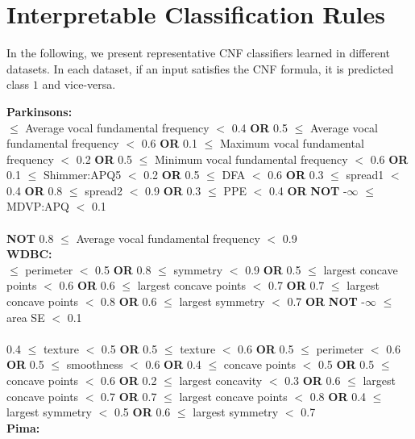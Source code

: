 \chapter{Interpretable Classification Rules}
In the following, we present representative CNF classifiers learned in different datasets. In each dataset, if an input satisfies the CNF formula, it is predicted class $ 1 $ and vice-versa.

\noindent \textbf{ Parkinsons: }\\

 $\le$ Average vocal fundamental frequency $<$ 0.4 \textbf{OR} 0.5 $\le$ Average vocal fundamental frequency $<$ 0.6 \textbf{OR} 0.1 $\le$ Maximum vocal fundamental frequency $<$ 0.2 \textbf{OR} 0.5 $\le$ Minimum vocal fundamental frequency $<$ 0.6 \textbf{OR} 0.1 $\le$ Shimmer:APQ5 $<$ 0.2 \textbf{OR} 0.5 $\le$ DFA $<$ 0.6 \textbf{OR} 0.3 $\le$ spread1 $<$ 0.4 \textbf{OR} 0.8 $\le$ spread2 $<$ 0.9 \textbf{OR} 0.3 $\le$ PPE $<$ 0.4 \textbf{OR}  \textbf{NOT} -$\infty$ $\le$ MDVP:APQ $<$ 0.1 \\\\ \textbf{NOT} 0.8 $\le$ Average vocal fundamental frequency $<$ 0.9 \\

\noindent \textbf{ WDBC: }\\

 $\le$ perimeter $<$ 0.5 \textbf{OR} 0.8 $\le$ symmetry $<$ 0.9 \textbf{OR} 0.5 $\le$ largest concave points $<$ 0.6 \textbf{OR} 0.6 $\le$ largest concave points $<$ 0.7 \textbf{OR} 0.7 $\le$ largest concave points $<$ 0.8 \textbf{OR} 0.6 $\le$ largest symmetry $<$ 0.7 \textbf{OR}  \textbf{NOT} -$\infty$ $\le$ area SE $<$ 0.1 \\\\0.4 $\le$ texture $<$ 0.5 \textbf{OR} 0.5 $\le$ texture $<$ 0.6 \textbf{OR} 0.5 $\le$ perimeter $<$ 0.6 \textbf{OR} 0.5 $\le$ smoothness $<$ 0.6 \textbf{OR} 0.4 $\le$ concave points $<$ 0.5 \textbf{OR} 0.5 $\le$ concave points $<$ 0.6 \textbf{OR} 0.2 $\le$ largest concavity $<$ 0.3 \textbf{OR} 0.6 $\le$ largest concave points $<$ 0.7 \textbf{OR} 0.7 $\le$ largest concave points $<$ 0.8 \textbf{OR} 0.4 $\le$ largest symmetry $<$ 0.5 \textbf{OR} 0.6 $\le$ largest symmetry $<$ 0.7 \\

\noindent \textbf{ Pima: }\\

